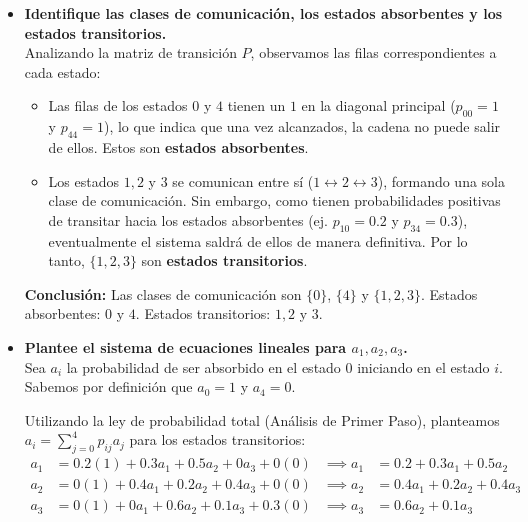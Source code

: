 \documentclass[10pt,a4paper]{book}
\begin{document}
\begin{itemize}
    \item[\textbf{a)}] \textbf{Identifique las clases de comunicación, los estados absorbentes y los estados transitorios.} \\
    Analizando la matriz de transición $P$, observamos las filas correspondientes a cada estado:
    \begin{itemize}
        \item Las filas de los estados $0$ y $4$ tienen un $1$ en la diagonal principal ($p_{00} = 1$ y $p_{44} = 1$), lo que indica que una vez alcanzados, la cadena no puede salir de ellos. Estos son \textbf{estados absorbentes}.
        \item Los estados $1, 2$ y $3$ se comunican entre sí ($1 \leftrightarrow 2 \leftrightarrow 3$), formando una sola clase de comunicación. Sin embargo, como tienen probabilidades positivas de transitar hacia los estados absorbentes (ej. $p_{10} = 0.2$ y $p_{34} = 0.3$), eventualmente el sistema saldrá de ellos de manera definitiva. Por lo tanto, $\{1, 2, 3\}$ son \textbf{estados transitorios}.
    \end{itemize}
    \textbf{Conclusión:} Las clases de comunicación son $\{0\}$, $\{4\}$ y $\{1, 2, 3\}$. Estados absorbentes: $0$ y $4$. Estados transitorios: $1, 2$ y $3$.

    \item[\textbf{b)}] \textbf{Plantee el sistema de ecuaciones lineales para $a_1, a_2, a_3$.} \\
    Sea $a_i$ la probabilidad de ser absorbido en el estado $0$ iniciando en el estado $i$. Sabemos por definición que $a_0 = 1$ y $a_4 = 0$.

    \vspace{0.2cm}
    
    Utilizando la ley de probabilidad total (Análisis de Primer Paso), planteamos $a_i = \sum_{j=0}^{4} p_{ij}a_j$ para los estados transitorios:
    \begin{align*}
        a_1 &= 0.2(1) + 0.3a_1 + 0.5a_2 + 0a_3 + 0(0) &\implies a_1 &= 0.2 + 0.3a_1 + 0.5a_2 \\
        a_2 &= 0(1) + 0.4a_1 + 0.2a_2 + 0.4a_3 + 0(0) &\implies a_2 &= 0.4a_1 + 0.2a_2 + 0.4a_3 \\
        a_3 &= 0(1) + 0a_1 + 0.6a_2 + 0.1a_3 + 0.3(0) &\implies a_3 &= 0.6a_2 + 0.1a_3
    \end{align*}


\end{itemize}
\end{document}
